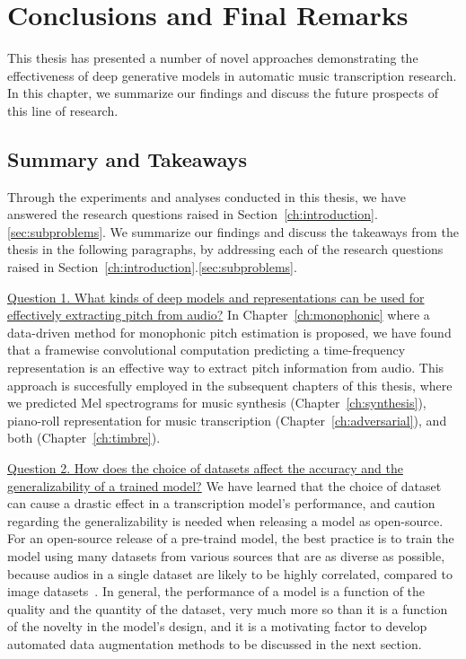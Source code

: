 
\graphicspath{{8-conclusions/figures/}}

\chapter{Conclusions and Final Remarks}
\label{ch:conclusions}

This thesis has presented a number of novel approaches demonstrating the effectiveness of deep generative models in automatic music transcription research.
In this chapter, we summarize our findings and discuss the future prospects of this line of research.

\section{Summary and Takeaways}


Through the experiments and analyses conducted in this thesis, we have answered the research questions raised in Section~\ref{ch:introduction}.\ref{sec:subproblems}.
We summarize our findings and discuss the takeaways from the thesis in the following paragraphs, by addressing each of the research questions raised in Section~\ref{ch:introduction}.\ref{sec:subproblems}.

\uline{Question 1. What kinds of deep models and representations can be used for effectively extracting pitch from audio?}
In Chapter~\ref{ch:monophonic} where a data-driven method for monophonic pitch estimation is proposed, we have found that a framewise convolutional computation predicting a time-frequency representation is an effective way to extract pitch information from audio.
This approach is succesfully employed in the subsequent chapters of this thesis, where we predicted Mel spectrograms for music synthesis (Chapter~\ref{ch:synthesis}), piano-roll representation for music transcription (Chapter~\ref{ch:adversarial}), and both (Chapter~\ref{ch:timbre}).

\uline{Question 2. How does the choice of datasets affect the accuracy and the generalizability of a trained model?}
We have learned that the choice of dataset can cause a drastic effect in a transcription model's performance, and caution regarding the generalizability is needed when releasing a model as open-source.
For an open-source release of a pre-traind model, the best practice is to train the model using many datasets from various sources that are as diverse as possible, because audios in a single dataset are likely to be highly correlated, compared to image datasets~\cite{thickstun2018invariances}.
In general, the performance of a model is a function of the quality and the quantity of the dataset, very much more so than it is a function of the novelty in the model's design, and it is a motivating factor to develop automated data augmentation methods to be discussed in the next section.


